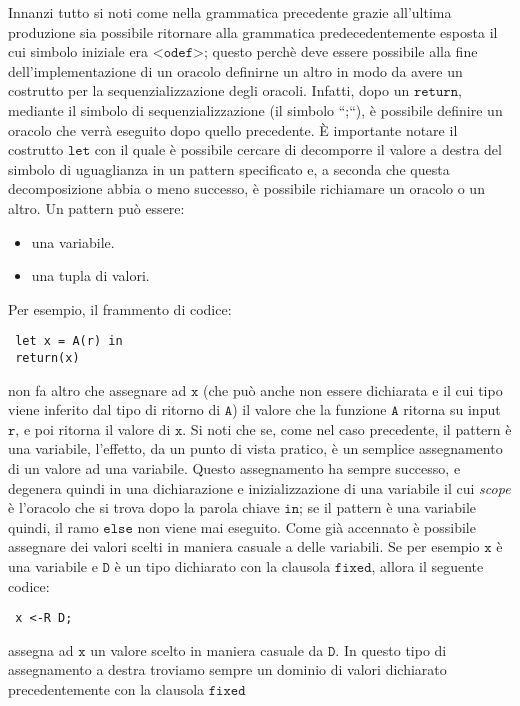 \documentclass[a4paper,openright,twoside,12pt]{report}
\begin{document}
Innanzi tutto si noti come nella grammatica precedente grazie all'ultima produzione sia possibile ritornare alla grammatica predecedentemente esposta il cui simbolo iniziale era $\texttt{<odef>}$; questo perch\`e deve
essere possibile alla fine dell'implementazione di un oracolo definirne un altro in modo da avere un costrutto per la sequenzializzazione degli oracoli. 
Infatti, dopo un $\texttt{return}$, mediante il simbolo di sequenzializzazione (il simbolo ``;``), \`e possibile definire un oracolo che verr\`a eseguito dopo quello precedente.
\`E importante notare il costrutto $\texttt{let}$ con il quale \`e possibile cercare di decomporre il valore a destra del simbolo di uguaglianza in un pattern specificato e, 
a seconda che questa decomposizione abbia o meno successo, \`e possibile richiamare un oracolo o un altro. 
Un pattern pu\`o essere:
\begin{itemize}
 \item una variabile.
 \item una tupla di valori. 
\end{itemize}
Per esempio, il frammento di codice:
\begin{verbatim}
 let x = A(r) in
 return(x) 
\end{verbatim}
non fa altro che assegnare ad $\texttt{x}$ (che pu\`o anche non essere dichiarata e il cui tipo viene inferito dal tipo di ritorno di $\texttt{A}$) il valore che la funzione $\texttt{A}$ ritorna su input $\texttt{r}$, e poi ritorna il valore di $\texttt{x}$.
Si noti che se, come nel caso precedente, il pattern \`e una variabile, l'effetto, da un punto di vista pratico, \`e un semplice assegnamento di un valore ad una variabile.
Questo assegnamento ha sempre successo, e degenera quindi in una dichiarazione e inizializzazione di una variabile il cui \emph{scope} \`e l'oracolo che si trova dopo la parola chiave $\texttt{in}$; 
se il pattern \`e una variabile quindi, il ramo $\texttt{else}$ non viene mai eseguito.
Come gi\`a accennato \`e possibile assegnare dei valori scelti in maniera casuale a delle variabili. Se per esempio $\texttt{x}$ \`e una variabile e $\texttt{D}$ \`e un tipo dichiarato
con la clausola $\texttt{fixed}$, allora il seguente codice:
\begin{verbatim}
 x <-R D;
\end{verbatim}
assegna ad $\texttt{x}$ un valore scelto in maniera casuale da $\texttt{D}$. In questo tipo di assegnamento a destra troviamo sempre un dominio di valori dichiarato precedentemente con la clausola $\texttt{fixed}$ \\
\end{document}
